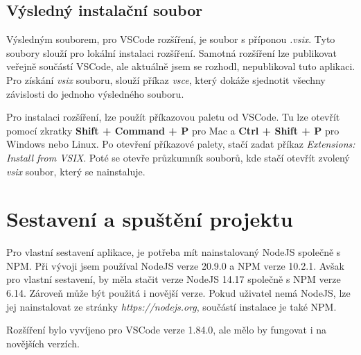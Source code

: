 \subsection*{Výsledný instalační soubor}

Výsledným souborem, pro VSCode rozšíření, je soubor s příponou \textit{.vsix}.
Tyto soubory slouží pro lokální instalaci rozšíření. 
Samotná rozšíření lze publikovat veřejně součástí VSCode, ale aktuálně jsem se rozhodl, nepublikoval tuto aplikaci.
Pro získání \textit{vsix} souboru, slouží příkaz \textit{vsce}, který dokáže sjednotit všechny závislosti do jednoho výsledného souboru.

Pro instalaci rozšíření, lze použít příkazovou paletu od VSCode.
Tu lze otevřít pomocí zkratky \textbf{Shift + Command + P} pro Mac a \textbf{Ctrl + Shift + P} pro Windows nebo Linux.
Po otevření příkazové palety, stačí zadat příkaz \textit{Extensions: Install from VSIX}.
Poté se otevře průzkumník souborů, kde stačí otevřít zvolený \textit{vsix} soubor, který se nainstaluje.


\section{Sestavení a spuštění projektu}

Pro vlastní sestavení aplikace, je potřeba mít nainstalovaný NodeJS společně s NPM.
Při vývoji jsem používal NodeJS verze 20.9.0 a NPM verze 10.2.1.
Avšak pro vlastní sestavení, by měla stačit verze NodeJS 14.17 společně s NPM verze 6.14.
Zároveň může být použitá i novější verze. 
Pokud uživatel nemá NodeJS, lze jej nainstalovat ze stránky \textit{https://nodejs.org}, součástí instalace je také NPM.

Rozšíření bylo vyvíjeno pro VSCode verze 1.84.0, ale mělo by fungovat i na novějších verzích.


\endinput